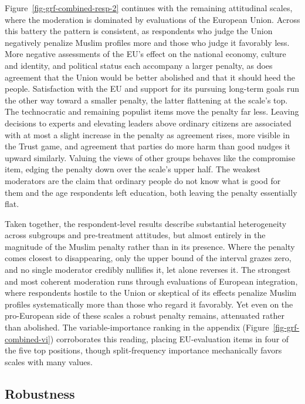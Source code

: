 \documentclass[
  10pt,
  a4paper,
  DIV=11,
  numbers=noendperiod]{scrartcl}
\begin{document}
Figure~\ref{fig-grf-combined-resp-2} continues with the remaining
attitudinal scales, where the moderation is dominated by evaluations of
the European Union. Across this battery the pattern is consistent, as
respondents who judge the Union negatively penalize Muslim profiles more
and those who judge it favorably less. More negative assessments of the
EU's effect on the national economy, culture and identity, and political
status each accompany a larger penalty, as does agreement that the Union
would be better abolished and that it should heed the people.
Satisfaction with the EU and support for its pursuing long-term goals
run the other way toward a smaller penalty, the latter flattening at the
scale's top. The technocratic and remaining populist items move the
penalty far less. Leaving decisions to experts and elevating leaders
above ordinary citizens are associated with at most a slight increase in
the penalty as agreement rises, more visible in the Trust game, and
agreement that parties do more harm than good nudges it upward
similarly. Valuing the views of other groups behaves like the compromise
item, edging the penalty down over the scale's upper half. The weakest
moderators are the claim that ordinary people do not know what is good
for them and the age respondents left education, both leaving the
penalty essentially flat.

Taken together, the respondent-level results describe substantial
heterogeneity across subgroups and pre-treatment attitudes, but almost
entirely in the magnitude of the Muslim penalty rather than in its
presence. Where the penalty comes closest to disappearing, only the
upper bound of the interval grazes zero, and no single moderator
credibly nullifies it, let alone reverses it. The strongest and most
coherent moderation runs through evaluations of European integration,
where respondents hostile to the Union or skeptical of its effects
penalize Muslim profiles systematically more than those who regard it
favorably. Yet even on the pro-European side of these scales a robust
penalty remains, attenuated rather than abolished. The
variable-importance ranking in the appendix
(Figure~\ref{fig-grf-combined-vi}) corroborates this reading, placing
EU-evaluation items in four of the five top positions, though
split-frequency importance mechanically favors scales with many values.

\subsection{Robustness}\label{sec-robustness}
\end{document}
